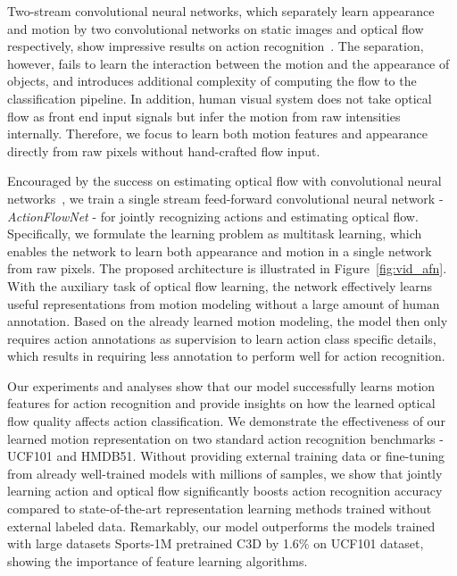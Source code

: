 \documentclass[10pt,twocolumn,letterpaper]{article}
\begin{document}
Two-stream convolutional neural networks, which separately learn appearance and motion by two convolutional networks on static images and optical flow respectively, show impressive results on action recognition~\cite{simonyanZ14a}. 
The separation, however, fails to learn the interaction between the motion and the appearance of objects, and introduces additional complexity of computing the flow to the classification pipeline.
In addition, human visual system does not take optical flow as front end input signals but infer the motion from raw intensities internally.
Therefore, we focus to learn both motion features and appearance directly from raw pixels without hand-crafted flow input.


Encouraged by the success on estimating optical flow with convolutional neural networks~\cite{FischerDIHHGSCB15}, we train a single stream feed-forward convolutional neural network - \mbox{\emph{ActionFlowNet}} - for jointly recognizing actions and estimating optical flow.
Specifically, we formulate the learning problem as multitask learning, which enables the network to learn both appearance and motion in a single network from raw pixels.
The proposed architecture is illustrated in Figure~\ref{fig:vid_afn}.
With the auxiliary task of optical flow learning, the network effectively learns useful representations from motion modeling without a large amount of human annotation.
Based on the already learned motion modeling, the model then only requires action annotations as supervision to learn action class specific details, which results in requiring less annotation to perform well for action recognition.

Our experiments and analyses show that our model successfully learns motion features for action recognition and provide insights on how the learned optical flow quality affects action classification.
We demonstrate the effectiveness of our learned motion representation on two standard action recognition benchmarks - UCF101 and HMDB51.
Without providing external training data or fine-tuning from already well-trained models with millions of samples, we show that jointly learning action and optical flow significantly boosts action recognition accuracy compared to state-of-the-art representation learning methods trained without external labeled data.
Remarkably, our model outperforms the models trained with large datasets Sports-1M pretrained C3D by 1.6\% on UCF101 dataset, showing the importance of feature learning algorithms.
 
\end{document}
